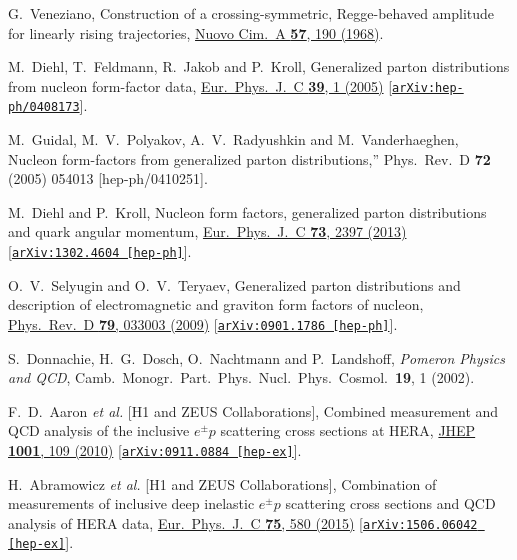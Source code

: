 \documentclass[aps,prd,preprint,groupedaddress]{revtex4-1}
\begin{document}
\begin{thebibliography}{99}
 
G.~Veneziano,
Construction of a crossing-symmetric, Regge-behaved amplitude for linearly rising trajectories,
\href{http://link.springer.com/article/10.1007%2FBF02824451}{Nuovo Cim.\ A {\bf 57}, 190 (1968)}.

 
  M.~Diehl, T.~Feldmann, R.~Jakob and P.~Kroll,
  Generalized parton distributions from nucleon form-factor data,
  \href{https://link.springer.com/article/10.1140%2Fepjc%2Fs2004-02063-4}{Eur.\ Phys.\ J.\ C {\bf 39}, 1 (2005)}
  [\href{https://arxiv.org/abs/hep-ph/0408173}{\tt arXiv:hep-ph/0408173}].
  
  
  M.~Guidal, M.~V.~Polyakov, A.~V.~Radyushkin and M.~Vanderhaeghen,
  Nucleon form-factors from generalized parton distributions,''
  Phys.\ Rev.\ D {\bf 72} (2005) 054013
  [hep-ph/0410251].
  
  
  M.~Diehl and P.~Kroll,
  Nucleon form factors, generalized parton distributions and quark angular momentum,
  \href{https://link.springer.com/article/10.1140%2Fepjc%2Fs2004-02063-4}{Eur.\ Phys.\ J.\ C {\bf 73}, 2397 (2013)}
  [\href{https://arxiv.org/abs/1302.4604}{\tt arXiv:1302.4604 [hep-ph]}].


  O.~V.~Selyugin and O.~V.~Teryaev,
  Generalized parton distributions and description of electromagnetic and graviton form factors of nucleon,
  \href{https://journals.aps.org/prd/abstract/10.1103/PhysRevD.79.033003}{Phys.\ Rev.\ D {\bf 79}, 033003 (2009)}
  [\href{https://arxiv.org/abs/0901.1786}{\tt arXiv:0901.1786 [hep-ph]}].
  
  
  S.~Donnachie, H.~G.~Dosch, O.~Nachtmann and P.~Landshoff,
  {\it Pomeron Physics and QCD},
  Camb.\ Monogr.\ Part.\ Phys.\ Nucl.\ Phys.\ Cosmol.\  {\bf 19}, 1 (2002).
  
  
  F.~D.~Aaron {\it et al.} [H1 and ZEUS Collaborations],
  Combined measurement and QCD analysis of the inclusive $e^\pm p$ scattering cross sections at HERA,
  \href{https://link.springer.com/article/10.1007%2FJHEP01%282010%29109}{JHEP {\bf 1001}, 109 (2010)}
  [\href{https://arxiv.org/abs/0911.0884}{\tt arXiv:0911.0884 [hep-ex]}].


  H.~Abramowicz {\it et al.} [H1 and ZEUS Collaborations],
  Combination of measurements of inclusive deep inelastic ${e^{\pm }p}$ scattering cross sections and QCD analysis of HERA data,
  \href{https://link.springer.com/article/10.1140%2Fepjc%2Fs10052-015-3710-4}{Eur.\ Phys.\ J.\ C {\bf 75}, 580 (2015)}
  [\href{https://arxiv.org/abs/1506.06042}{\tt arXiv:1506.06042 [hep-ex]}].
    

\end{thebibliography}
\end{document}
